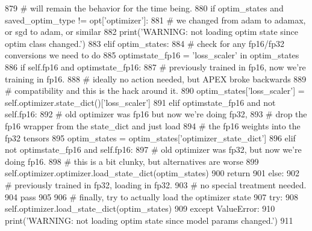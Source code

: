 \begin{DoxyCode}
879         \textcolor{comment}{# will remain the behavior for the time being.}
880         \textcolor{keywordflow}{if} optim\_states \textcolor{keywordflow}{and} saved\_optim\_type != opt[\textcolor{stringliteral}{'optimizer'}]:
881             \textcolor{comment}{# we changed from adam to adamax, or sgd to adam, or similar}
882             print(\textcolor{stringliteral}{'WARNING: not loading optim state since optim class changed.'})
883         \textcolor{keywordflow}{elif} optim\_states:
884             \textcolor{comment}{# check for any fp16/fp32 conversions we need to do}
885             optimstate\_fp16 = \textcolor{stringliteral}{'loss\_scaler'} \textcolor{keywordflow}{in} optim\_states
886             \textcolor{keywordflow}{if} self.fp16 \textcolor{keywordflow}{and} optimstate\_fp16:
887                 \textcolor{comment}{# previously trained in fp16, now we're training in fp16.}
888                 \textcolor{comment}{# ideally no action needed, but APEX broke backwards}
889                 \textcolor{comment}{# compatibility and this is the hack around it.}
890                 optim\_states[\textcolor{stringliteral}{'loss\_scaler'}] = self.optimizer.state\_dict()[\textcolor{stringliteral}{'loss\_scaler'}]
891             \textcolor{keywordflow}{elif} optimstate\_fp16 \textcolor{keywordflow}{and} \textcolor{keywordflow}{not} self.fp16:
892                 \textcolor{comment}{# old optimizer was fp16 but now we're doing fp32,}
893                 \textcolor{comment}{# drop the fp16 wrapper from the state\_dict and just load}
894                 \textcolor{comment}{# the fp16 weights into the fp32 tensors}
895                 optim\_states = optim\_states[\textcolor{stringliteral}{'optimizer\_state\_dict'}]
896             \textcolor{keywordflow}{elif} \textcolor{keywordflow}{not} optimstate\_fp16 \textcolor{keywordflow}{and} self.fp16:
897                 \textcolor{comment}{# old optimizer was fp32, but now we're doing fp16.}
898                 \textcolor{comment}{# this is a bit clunky, but alternatives are worse}
899                 self.optimizer.optimizer.load\_state\_dict(optim\_states)
900                 \textcolor{keywordflow}{return}
901             \textcolor{keywordflow}{else}:
902                 \textcolor{comment}{# previously trained in fp32, loading in fp32.}
903                 \textcolor{comment}{# no special treatment needed.}
904                 \textcolor{keywordflow}{pass}
905 
906             \textcolor{comment}{# finally, try to actually load the optimizer state}
907             \textcolor{keywordflow}{try}:
908                 self.optimizer.load\_state\_dict(optim\_states)
909             \textcolor{keywordflow}{except} ValueError:
910                 print(\textcolor{stringliteral}{'WARNING: not loading optim state since model params changed.'})
911 
\end{DoxyCode}
